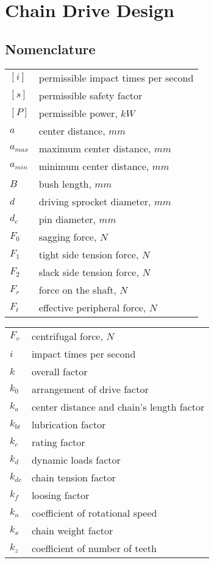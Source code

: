 \chapter{Chain Drive Design}
\section{Nomenclature}
\begin{tabular}[t]{lp{6.5cm}}
		$ [i] $ & permissible impact times per second\\
		$ [s] $ & permissible safety factor\\
		$ [P] $ & permissible power, $ \unit{kW} $\\
		$ a $ & center distance, $ \unit{mm} $\\
		$ a_{max} $ & maximum center distance, $ \unit{mm} $\\
		$ a_{min} $ & minimum center distance, $ \unit{mm} $\\
		$ B $ & bush length, $ \unit{mm} $\\
		$ d $ & driving sprocket diameter, $ \unit{mm} $\\
		$ d_c $ & pin diameter, $ \unit{mm} $\\
		$ F_0 $ & sagging force, $ \unit{N} $\\
		$ F_1 $ & tight side tension force, $ \unit{N} $\\
		$ F_2 $ & slack side tension force, $ \unit{N} $\\
		$ F_r $ & force on the shaft, $ \unit{N} $\\
		$ F_t $ & effective peripheral force, $ \unit{N} $\\
\end{tabular}
\begin{tabular}[t]{lp{6.5cm}}
		$ F_v $ & centrifugal force, $ \unit{N} $\\
		$ i $ & impact times per second\\
		$ k $ & overall factor\\
		$ k_0 $ & arrangement of drive factor\\
		$ k_a $ & center distance and chain's length factor\\
		$ k_{bt} $ & lubrication factor\\
		$ k_c $ & rating factor\\
		$ k_d $ & dynamic loads factor\\
		$ k_{dc} $ & chain tension  factor\\
		$ k_f $ & loosing factor\\
		$ k_n $ & coefficient of rotational speed\\
		$ k_x $ & chain weight factor\\
		$ k_z $ & coefficient of number of teeth\\
\end{tabular}\newpage

